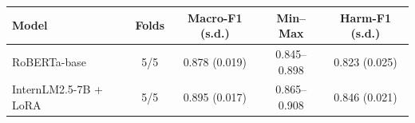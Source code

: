 \begin{tabular}{lcccc}
\toprule
Model & Folds & Macro-F1 (s.d.) & Min--Max & Harm-F1 (s.d.) \\
\midrule
RoBERTa-base & 5/5 & 0.878 (0.019) & 0.845--0.898 & 0.823 (0.025) \\
InternLM2.5-7B + LoRA & 5/5 & 0.895 (0.017) & 0.865--0.908 & 0.846 (0.021) \\
\bottomrule
\end{tabular}
